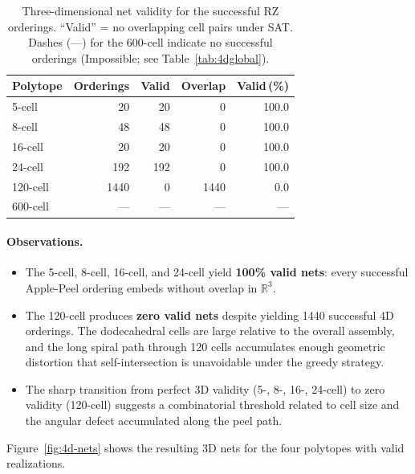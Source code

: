 \documentclass[12pt]{article}
\theoremstyle{definition}
\begin{document}
\begin{table}[ht]
\centering
\caption{Three-dimensional net validity for the successful RZ orderings.
  ``Valid'' = no overlapping cell pairs under SAT\@.
  Dashes (---) for the 600-cell indicate no successful orderings
  (Impossible; see Table~\ref{tab:4dglobal}).}
\label{tab:3dnet}
\renewcommand{\arraystretch}{1.2}
\begin{tabular}{lrrrr}
\toprule
Polytope & Orderings & Valid & Overlap & Valid\,(\%) \\
\midrule
5-cell   &   20  &   20  &     0  & 100.0 \\
8-cell   &   48  &   48  &     0  & 100.0 \\
16-cell  &   20  &   20  &     0  & 100.0 \\
24-cell  &  192  &  192  &     0  & 100.0 \\
120-cell & 1440  &    0  &  1440  &   0.0 \\
600-cell &   —   &   —   &    —   &    —  \\
\bottomrule
\end{tabular}
\end{table}

\paragraph{Observations.}
\begin{itemize}[nosep]
  \item The 5-cell, 8-cell, 16-cell, and 24-cell yield \textbf{100\% valid nets}:
        every successful Apple-Peel ordering embeds without overlap in
        $\mathbb{R}^3$.
  \item The 120-cell produces \textbf{zero valid nets} despite yielding
        1440 successful 4D orderings.
        The dodecahedral cells are large relative to the overall
        assembly, and the long spiral path through 120 cells
        accumulates enough geometric distortion that self-intersection
        is unavoidable under the greedy strategy.
  \item The sharp transition from perfect 3D validity (5-, 8-, 16-, 24-cell)
        to zero validity (120-cell) suggests a combinatorial threshold
        related to cell size and the angular defect accumulated along
        the peel path.
\end{itemize}
Figure~\ref{fig:4d-nets} shows the resulting 3D nets for the four polytopes with valid realizations.
\end{document}
